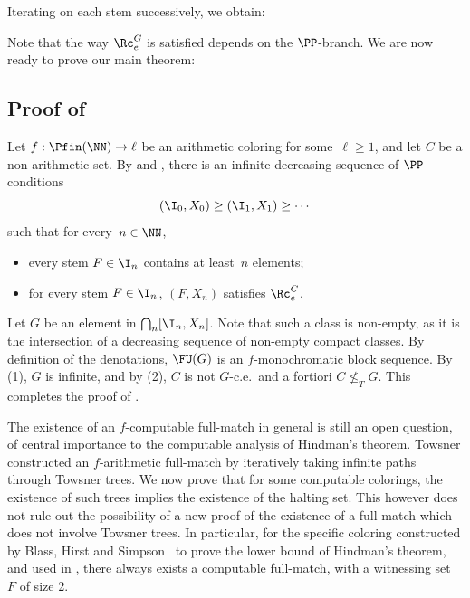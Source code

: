 \documentclass{article}
\numberwithin{theorem}{section}
\newtheorem{lemma}[theorem]{Lemma}
\begin{document}
Iterating  on each stem successively, we obtain:


Note that the way $\Rc^G_e$ is satisfied depends on the $\PP$-branch.
We are now ready to prove our main theorem:

\subsection{Proof of }

Let $f : \Pfin(\NN) \to \ell$ be an arithmetic coloring for some~$\ell \geq 1$, and let $C$ be a non-arithmetic set.
By  and , there is an infinite decreasing sequence of $\PP$-conditions
$$
(\I_0, X_0) \geq (\I_1, X_1) \geq \cdots
$$
such that for every~$n \in \NN$,
\begin{itemize}
    \item[(1)] every stem $F \in \I_n$ contains at least~$n$ elements;
    \item[(2)] for every stem $F \in \I_n$, $(F, X_n)$ satisfies $\Rc^C_e$.
\end{itemize}
Let $G$ be an element in $\bigcap_n [\I_n, X_n]$. Note that such a class is non-empty, as it is the intersection of a decreasing sequence of non-empty compact classes. By definition of the denotations, $\FU(G)$ is an $f$-monochromatic block sequence. By (1), $G$ is infinite, and by (2), $C$ is not $G$-c.e.\ and a fortiori $C \not \leq_T G$. This completes the proof of .
\bigskip

The existence of an $f$-computable full-match in general is still an open question, of central importance to the computable analysis of Hindman's theorem. Towsner constructed an $f$-arithmetic full-match by iteratively taking infinite paths through Towsner trees. We now prove that for some computable colorings, the existence of such trees implies the existence of the halting set. This however does not rule out the possibility of a new proof of the existence of a full-match which does not involve Towsner trees. In particular, for the specific coloring constructed by Blass, Hirst and Simpson~\cite{blassLogicalAnalysisTheorems1987} to prove the lower bound of Hindman's theorem, and used in , there always exists a computable full-match, with a witnessing set~$F$ of size 2.
\end{document}
